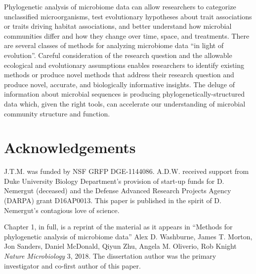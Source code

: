 Phylogenetic analysis of microbiome data can allow researchers to categorize unclassified microorganisms, test evolutionary hypotheses about trait associations or traits driving habitat associations, and better understand how microbial communities differ and how they change over time, space, and treatments. There are several classes of methods for analyzing microbiome data “in light of evolution”. Careful consideration of the research question and the allowable ecological and evolutionary assumptions enables researchers to identify existing methods or produce novel methods that address their research question and produce novel, accurate, and biologically informative insights. The deluge of information about microbial sequences is producing phylogenetically-structured data which, given the right tools, can accelerate our understanding of microbial community structure and function.

\section{Acknowledgements}
J.T.M. was funded by NSF GRFP DGE-1144086. A.D.W. received support from Duke University Biology Department’s provision of start-up funds for D. Nemergut (deceased) and the Defense Advanced Research Projects Agency (DARPA) grant D16AP0013. This paper is published in the spirit of D. Nemergut’s contagious love of science.

Chapter 1, in full, is a reprint of the material as it appears in
``Methods for phylogenetic analysis of microbiome data''
Alex D. Washburne, James T. Morton, Jon Sanders, Daniel McDonald,
Qiyun Zhu, Angela M. Oliverio, Rob Knight  \emph{Nature Microbiology} 3, 2018. The dissertation author was the primary investigator and co-first author of this paper.

